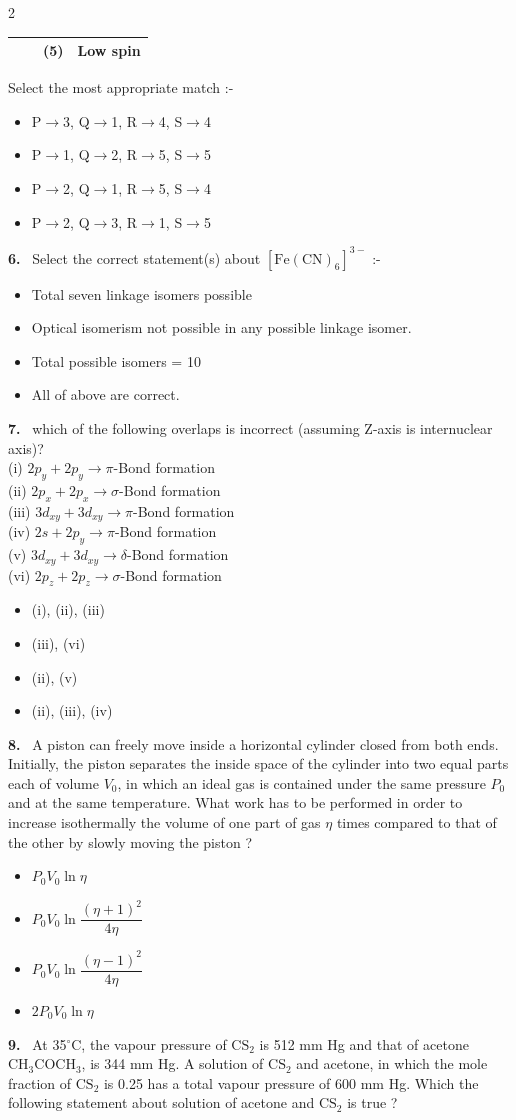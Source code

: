 \documentclass[10pt]{extarticle}
\newcommand{\qn}[1]{\par\smallskip\noindent\textbf{#1.}~}
\newenvironment{qoptions}{\begin{itemize}[leftmargin=1.8em,itemsep=1pt,topsep=2pt,label={}]}{\end{itemize}}
\newcommand{\opt}[2]{\item[(#1)] #2}
\begin{document}
\begin{multicols}{2}
{\begin{tabular}{|l|l|l|l|}
 & & (5) & Low spin\\
\hline
\end{tabular}}\par\smallskip
Select the most appropriate match :-
\begin{qoptions}
\opt{A}{P$\to$3, Q$\to$1, R$\to$4, S$\to$4}
\opt{B}{P$\to$1, Q$\to$2, R$\to$5, S$\to$5}
\opt{C}{P$\to$2, Q$\to$1, R$\to$5, S$\to$4}
\opt{D}{P$\to$2, Q$\to$3, R$\to$1, S$\to$5}
\end{qoptions}
\qn{6} Select the correct statement(s) about $\mathrm{[Fe(CN)_6]^{3-}}$ :-
\begin{qoptions}
\opt{A}{Total seven linkage isomers possible}
\opt{B}{Optical isomerism not possible in any possible linkage isomer.}
\opt{C}{Total possible isomers = 10}
\opt{D}{All of above are correct.}
\end{qoptions}
\qn{7} which of the following overlaps is incorrect (assuming Z-axis is internuclear axis)?\\
(i) $2p_y+2p_y\to\pi$-Bond formation\\
(ii) $2p_x+2p_x\to\sigma$-Bond formation\\
(iii) $3d_{xy}+3d_{xy}\to\pi$-Bond formation\\
(iv) $2s+2p_y\to\pi$-Bond formation\\
(v) $3d_{xy}+3d_{xy}\to\delta$-Bond formation\\
(vi) $2p_z+2p_z\to\sigma$-Bond formation
\begin{qoptions}
\opt{A}{(i), (ii), (iii)}
\opt{B}{(iii), (vi)}
\opt{C}{(ii), (v)}
\opt{D}{(ii), (iii), (iv)}
\end{qoptions}
\qn{8} A piston can freely move inside a horizontal cylinder closed from both ends. Initially, the piston separates the inside space of the cylinder into two equal parts each of volume $V_0$, in which an ideal gas is contained under the same pressure $P_0$ and at the same temperature. What work has to be performed in order to increase isothermally the volume of one part of gas $\eta$ times compared to that of the other by slowly moving the piston ?
\begin{qoptions}
\opt{A}{$P_0V_0\ln\eta$}
\opt{B}{$P_0V_0\ln\dfrac{(\eta+1)^2}{4\eta}$}
\opt{C}{$P_0V_0\ln\dfrac{(\eta-1)^2}{4\eta}$}
\opt{D}{$2P_0V_0\ln\eta$}
\end{qoptions}
\qn{9} At 35$^\circ$C, the vapour pressure of $\mathrm{CS_2}$ is 512 mm Hg and that of acetone $\mathrm{CH_3COCH_3}$, is 344 mm Hg. A solution of $\mathrm{CS_2}$ and acetone, in which the mole fraction of $\mathrm{CS_2}$ is 0.25 has a total vapour pressure of 600 mm Hg. Which the following statement about solution of acetone and $\mathrm{CS_2}$ is true ?

\end{multicols}
\end{document}
